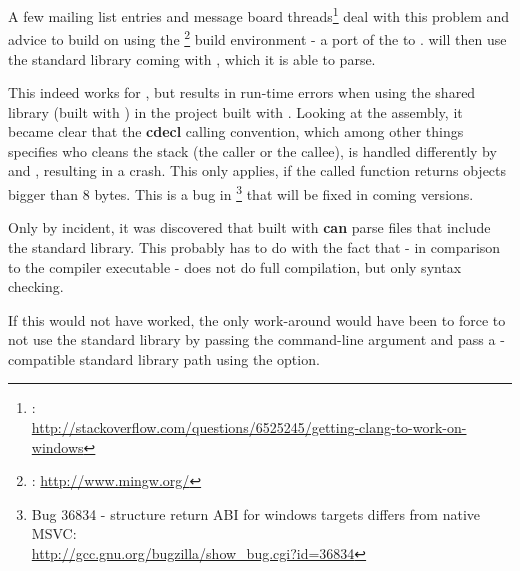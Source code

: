 A few mailing list entries and message board threads\footnote{:\\ \url{http://stackoverflow.com/questions/6525245/getting-clang-to-work-on-windows}} deal with this problem and advice to build  on  using the \footnote{: \url{http://www.mingw.org/}} build environment - a port of the  to .  will then use the standard library coming with , which it is able to parse.

This indeed works for , but results in run-time errors when using the  shared library (built with ) in the  project built with . Looking at the assembly, it became clear that the \textbf{cdecl} calling convention, which among other things specifies who cleans the stack (the caller or the callee), is handled differently by  and , resulting in a crash. This only applies, if the called function returns objects bigger than 8 bytes. This is a bug in \footnote{Bug 36834 - structure return ABI for windows targets differs from native MSVC:\\ \url{http://gcc.gnu.org/bugzilla/show_bug.cgi?id=36834}} that will be fixed in coming versions.

Only by incident, it was discovered that  built with  \textbf{can} parse files that include the   standard library. This probably has to do with the fact that  - in comparison to the  compiler executable - does not do full compilation, but only syntax checking.

If this would not have worked, the only work-around would have been to force  to not use the standard library by passing the  command-line argument and pass a -compatible standard library path using the  option.
